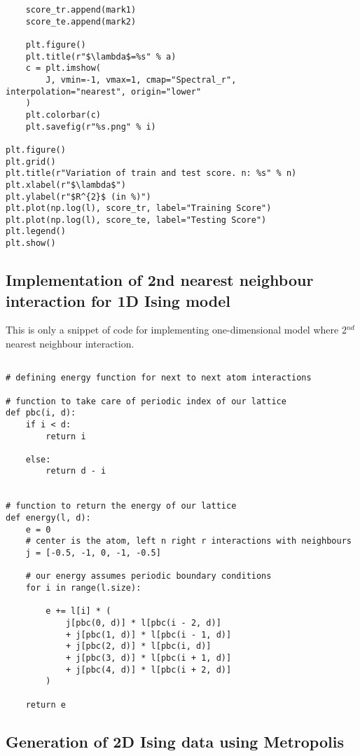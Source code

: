 \begin{verbatim}
    score_tr.append(mark1)
    score_te.append(mark2)

    plt.figure()
    plt.title(r"$\lambda$=%s" % a)
    c = plt.imshow(
        J, vmin=-1, vmax=1, cmap="Spectral_r", interpolation="nearest", origin="lower"
    )
    plt.colorbar(c)
    plt.savefig(r"%s.png" % i)

plt.figure()
plt.grid()
plt.title(r"Variation of train and test score. n: %s" % n)
plt.xlabel(r"$\lambda$")
plt.ylabel(r"$R^{2}$ (in %)")
plt.plot(np.log(l), score_tr, label="Training Score")
plt.plot(np.log(l), score_te, label="Testing Score")
plt.legend()
plt.show()
\end{verbatim}

\subsection{Implementation of 2nd nearest neighbour interaction for 1D Ising model}

This is only a snippet of code for implementing one-dimensional model where 2$^{nd}$ nearest neighbour interaction.

\begin{verbatim}

# defining energy function for next to next atom interactions

# function to take care of periodic index of our lattice
def pbc(i, d):
    if i < d:
        return i

    else:
        return d - i


# function to return the energy of our lattice
def energy(l, d):
    e = 0
    # center is the atom, left n right r interactions with neighbours
    j = [-0.5, -1, 0, -1, -0.5]

    # our energy assumes periodic boundary conditions
    for i in range(l.size):

        e += l[i] * (
            j[pbc(0, d)] * l[pbc(i - 2, d)]
            + j[pbc(1, d)] * l[pbc(i - 1, d)]
            + j[pbc(2, d)] * l[pbc(i, d)]
            + j[pbc(3, d)] * l[pbc(i + 1, d)]
            + j[pbc(4, d)] * l[pbc(i + 2, d)]
        )

    return e
\end{verbatim}

\subsection{Generation of 2D Ising data using Metropolis}

